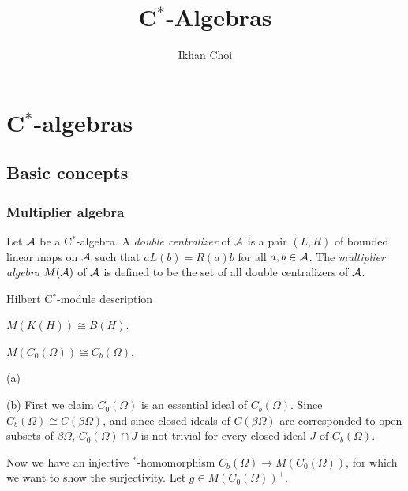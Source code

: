 \documentclass{../../large}
\begin{document}
\title{C$^*$-Algebras}
\author{Ikhan Choi}
\maketitle
\tableofcontents

\part{C$^*$-algebras}
\chapter{Basic concepts}

\section{Multiplier algebra}

\begin{prb}
Let $\mathcal{A}$ be a C$^*$-algebra.
A \emph{double centralizer} of $\mathcal{A}$ is a pair $(L,R)$ of bounded linear maps on $\mathcal{A}$ such that $aL(b)=R(a)b$ for all $a,b\in\mathcal{A}$.
The \emph{multiplier algebra} $M(\mathcal{A})$ of $\mathcal{A}$ is defined to be the set of all double centralizers of $\mathcal{A}$.
\end{prb}

\begin{prb}
\begin{parts}
\item Hilbert C$^*$-module description
\end{parts}
\end{prb}

\begin{prb}
\begin{parts}
\item $M(K(H))\cong B(H)$.
\item $M(C_0(\Omega))\cong C_b(\Omega)$.
\end{parts}
\end{prb}
\begin{pf}
(a)

(b)
First we claim $C_0(\Omega)$ is an essential ideal of $C_b(\Omega)$.
Since $C_b(\Omega)\cong C(\beta\Omega)$, and since closed ideals of $C(\beta\Omega)$ are corresponded to open subsets of $\beta\Omega$, $C_0(\Omega)\cap J$ is not trivial for every closed ideal $J$ of $C_b(\Omega)$.

Now we have an injective $^*$-homomorphism $C_b(\Omega)\to M(C_0(\Omega))$, for which we want to show the surjectivity.
Let $g\in M(C_0(\Omega))^+$.
\end{pf}
\end{document}
